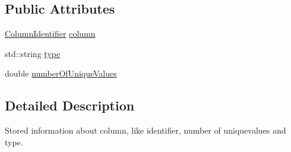 \subsection*{Public Attributes}
\begin{DoxyCompactItemize}
\item 
\hyperlink{class_column_identifier}{Column\+Identifier} \hyperlink{class_column_info_a13c87a82665272f3eb3e18a8323d0d7e}{column}
\item 
std\+::string \hyperlink{class_column_info_add303d9d4415fc18b790d9a904831c29}{type}
\item 
double \hyperlink{class_column_info_add402bfa7bed26aa6072c5da9b06dda9}{number\+Of\+Unique\+Values}
\end{DoxyCompactItemize}


\subsection{Detailed Description}
Stored information about column, like identifier, number of uniquevalues and type. 

